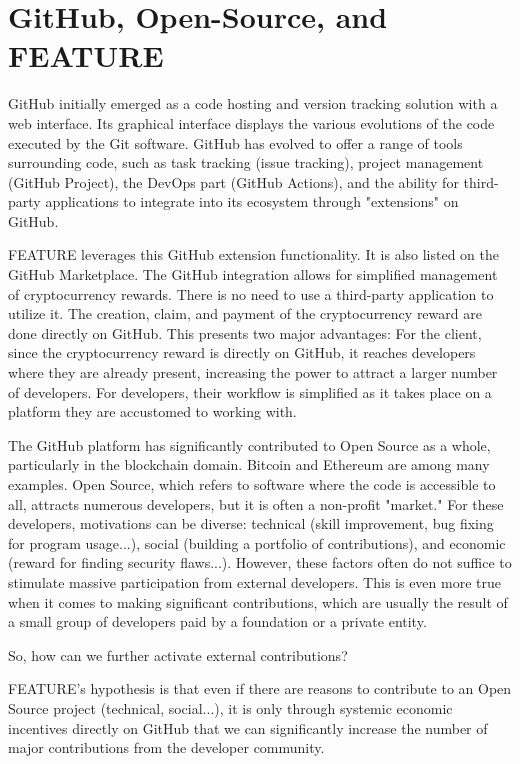 \documentclass[
	a4paper, %
	10pt, %
	unnumberedsections, %
	twoside, %
]{LTJournalArticle}
\begin{document}

\section{GitHub, Open-Source, and FEATURE}

GitHub initially emerged as a code hosting and version tracking solution with a web interface. Its graphical interface displays the various evolutions of the code executed by the Git software. GitHub has evolved to offer a range of tools surrounding code, such as task tracking (issue tracking), project management (GitHub Project), the DevOps part (GitHub Actions), and the ability for third-party applications to integrate into its ecosystem through "extensions" on GitHub.

FEATURE leverages this GitHub extension functionality. It is also listed on the GitHub Marketplace. The GitHub integration allows for simplified management of cryptocurrency rewards. There is no need to use a third-party application to utilize it. The creation, claim, and payment of the cryptocurrency reward are done directly on GitHub. This presents two major advantages: For the client, since the cryptocurrency reward is directly on GitHub, it reaches developers where they are already present, increasing the power to attract a larger number of developers. For developers, their workflow is simplified as it takes place on a platform they are accustomed to working with.

The GitHub platform has significantly contributed to Open Source as a whole, particularly in the blockchain domain. Bitcoin and Ethereum are among many examples. Open Source, which refers to software where the code is accessible to all, attracts numerous developers, but it is often a non-profit "market." For these developers, motivations can be diverse: technical (skill improvement, bug fixing for program usage...), social (building a portfolio of contributions), and economic (reward for finding security flaws...). However, these factors often do not suffice to stimulate massive participation from external developers. This is even more true when it comes to making significant contributions, which are usually the result of a small group of developers paid by a foundation or a private entity.

So, how can we further activate external contributions?

FEATURE's hypothesis is that even if there are reasons to contribute to an Open Source project (technical, social...), it is only through systemic economic incentives directly on GitHub that we can significantly increase the number of major contributions from the developer community.
\end{document}
